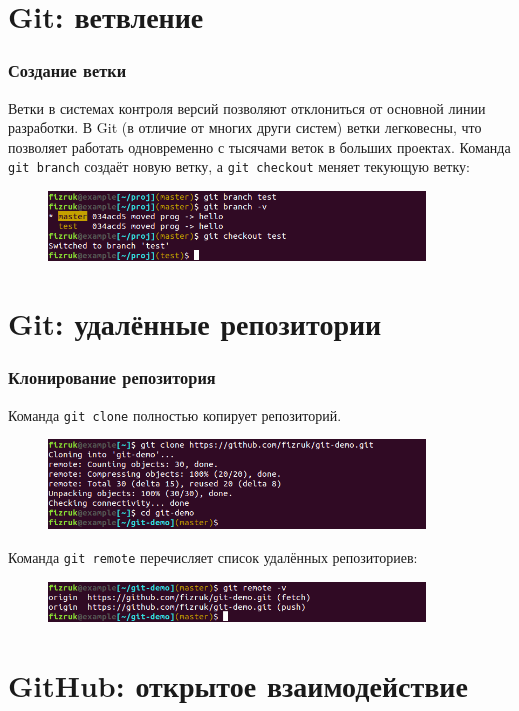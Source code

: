 \documentclass{beamer}
\begin{document}
\section{Git: ветвление}

\begin{frame}
  \frametitle{Создание ветки}
  Ветки в системах контроля версий позволяют отклониться от основной
  линии разработки. В Git (в отличие от многих други систем) ветки
  легковесны, что позволяет работать одновременно с тысячами веток
  в больших проектах.
  Команда \texttt{git branch} создаёт новую ветку, а \texttt{git checkout}
  меняет текующую ветку:

  \begin{figure}
    \includegraphics[width=10cm]{images/git-branch.png}
  \end{figure}
\end{frame}

\section{Git: удалённые репозитории}

\begin{frame}
  \frametitle{Клонирование репозитория}
  Команда \texttt{git clone} полностью копирует репозиторий.

  \begin{figure}
    \includegraphics[width=10cm]{images/git-clone.png}
  \end{figure}

  Команда \texttt{git remote} перечисляет список удалённых репозиториев:

  \begin{figure}
    \includegraphics[width=10cm]{images/git-remote.png}
  \end{figure}
\end{frame}

\section{GitHub: открытое взаимодействие}
\end{document}
